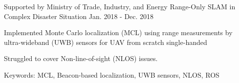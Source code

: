 \begin{cventries}
    \cventry
      {Supported by Ministry of Trade, Industry, and Energy} %
      {Range-Only SLAM in Complex Disaster Situation} %
      {\urban} %
      {Jan. 2018 - Dec. 2018} %
      {
        \begin{cvitems} %
          \item Implemented Monte Carlo localization (MCL) using range measurements by ultra-wideband (UWB) sensors for UAV from scratch single-handed
          \item Struggled to cover Non-line-of-sight (NLOS) issues.
          \item Keywords: MCL, Beacon-based localization, UWB sensors, NLOS, ROS
        \end{cvitems}
      }
\end{cventries}

